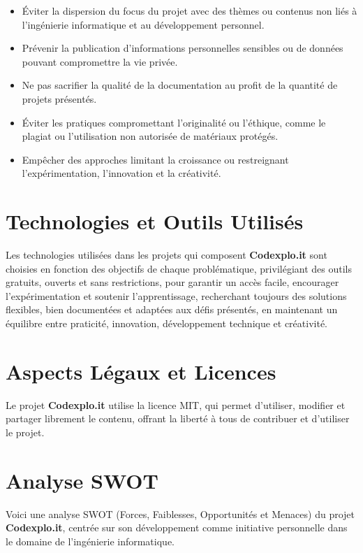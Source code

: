 \documentclass[10pt, a4paper, oneside]{article}
\begin{document}
\begin{itemize}
    \item Éviter la dispersion du focus du projet avec des thèmes ou contenus non liés à l’ingénierie informatique et au développement personnel.
    \item Prévenir la publication d’informations personnelles sensibles ou de données pouvant compromettre la vie privée.
    \item Ne pas sacrifier la qualité de la documentation au profit de la quantité de projets présentés.
    \item Éviter les pratiques compromettant l’originalité ou l’éthique, comme le plagiat ou l’utilisation non autorisée de matériaux protégés.
    \item Empêcher des approches limitant la croissance ou restreignant l’expérimentation, l’innovation et la créativité.
\end{itemize}

\section{Technologies et Outils Utilisés}

Les technologies utilisées dans les projets qui composent \textbf{Codexplo.it} sont choisies en fonction des objectifs de chaque problématique, privilégiant des outils gratuits, ouverts et sans restrictions, pour garantir un accès facile, encourager l’expérimentation et soutenir l’apprentissage, recherchant toujours des solutions flexibles, bien documentées et adaptées aux défis présentés, en maintenant un équilibre entre praticité, innovation, développement technique et créativité.

\section{Aspects Légaux et Licences}

Le projet \textbf{Codexplo.it} utilise la licence MIT, qui permet d’utiliser, modifier et partager librement le contenu, offrant la liberté à tous de contribuer et d’utiliser le projet.

\section{Analyse SWOT}

Voici une analyse SWOT (Forces, Faiblesses, Opportunités et Menaces) du projet \textbf{Codexplo.it}, centrée sur son développement comme initiative personnelle dans le domaine de l’ingénierie informatique.
\end{document}
